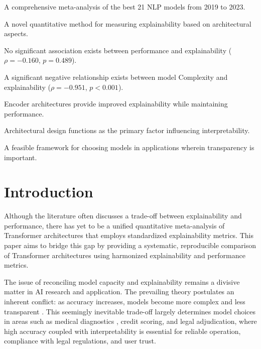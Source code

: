 \documentclass[preprint,12pt]{elsarticle}
\begin{document}
\begin{highlights}
\item A comprehensive meta-analysis of the best 21 NLP models from 2019 to 2023.
\item A novel quantitative method for measuring explainability based on architectural aspects.
\item No significant association exists between performance and explainability ($\rho = -0.160$, $p = 0.489$).
\item A significant negative relationship exists between model Complexity and explainability ($\rho = -0.951$, $p < 0.001$).
\item Encoder architectures provide improved explainability while maintaining performance.
\item Architectural design functions as the primary factor influencing interpretability.
\item A feasible framework for choosing models in applications wherein transparency is important.
\end{highlights}

\section{Introduction}
\label{sec:intro}

Although the literature often discusses a trade-off between explainability and performance, there has yet to be a unified quantitative meta-analysis of Transformer architectures that employs standardized explainability metrics. This paper aims to bridge this gap by providing a systematic, reproducible comparison of Transformer architectures using harmonized explainability and performance metrics.

The‍‌ issue of reconciling model capacity and explainability remains a divisive matter in AI research and application. The prevailing theory postulates an inherent conflict: as accuracy increases, models become more complex and less transparent \cite{lipton2018mythos,rudin2019stop}. This seemingly inevitable trade-off largely determines model choices in areas such as medical diagnostics \cite{rajpurkar2017chexnet}, credit scoring, and legal adjudication, where high accuracy coupled with interpretability is essential for reliable operation, compliance with legal regulations, and user trust.
\end{document}
